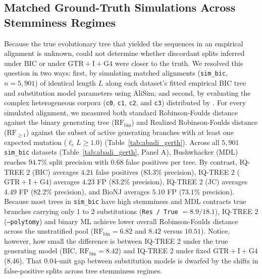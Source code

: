 \documentclass[11pt,a4paper]{article}
\begin{document}
\subsection{Matched Ground-Truth Simulations Across Stemminess Regimes}

Because the true evolutionary tree that yielded the sequences in an empirical alignment is unknown, \citet{gerth2019cannot} could not determine whether discordant splits inferred under BIC or under $\text{GTR}+\text{I}+\text{G4}$ were closer to the truth. We resolved this question in two ways: first, by simulating matched alignments (\texttt{sim\_bic}, $n = 5,901$) of identical length $L$ along each dataset's fitted empirical BIC tree and substitution model parameters using AliSim; and second, by evaluating the complex heterogeneous corpora (\texttt{c0}, \texttt{c1}, \texttt{c2}, and \texttt{c3}) distributed by \citet{abadi2019model}. For every simulated alignment, we measured both standard Robinson-Foulds distance against the binary generating tree ($\text{RF}_{\text{bin}}$) and Realized Robinson-Foulds distance ($\text{RF}_{\ge 1}$) against the subset of active generating branches with at least one expected mutation ($\ell_e L \ge 1.0$) (Table~\ref{tab:abadi_gerth}). Across all $5,901$ \texttt{sim\_bic} datasets (Table~\ref{tab:abadi_gerth}, Panel A), Bushwhacker (MDL) reaches $94.7\%$ split precision with $0.68$ false positives per tree. By contrast, IQ-TREE 2 (BIC) averages $4.21$ false positives ($83.3\%$ precision), IQ-TREE 2 ($\text{GTR}+\text{I}+\text{G4}$) averages $4.23$ FP ($83.2\%$ precision), IQ-TREE 2 (JC) averages $4.49$ FP ($82.2\%$ precision), and BioNJ averages $5.10$ FP ($73.1\%$ precision). Because most trees in \texttt{sim\_bic} have high stemminess and MDL contracts true branches carrying only $1$ to $2$ substitutions (\texttt{Res / True} $= 8.9 / 18.1$), IQ-TREE 2 (\texttt{--polytomy}) and binary ML achieve lower overall Robinson-Foulds distance across the unstratified pool ($\text{RF}_{\text{bin}} = 6.82$ and $8.42$ versus $10.51$). Notice, however, how small the difference is between IQ-TREE 2 under the true generating model (BIC, $\text{RF}_{\text{bin}} = 8.42$) and IQ-TREE 2 under fixed $\text{GTR}+\text{I}+\text{G4}$ ($8.46$). That $0.04$-unit gap between substitution models is dwarfed by the shifts in false-positive splits across tree stemminess regimes.
\end{document}

